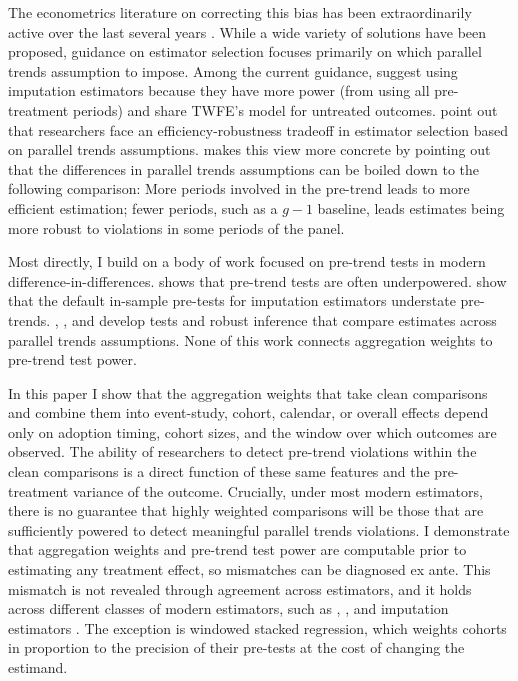 \documentclass[12pt]{article}
\begin{document}
The econometrics literature on correcting this bias has been extraordinarily active over the last several years \parencite{callaway2021difference, sun2021estimating, borusyak2024revisiting, gardner2022two, goodman2021difference,baker2022much, baker2026difference}. While a wide variety of solutions have been proposed, guidance on estimator selection focuses primarily on which parallel trends assumption to impose. Among the current guidance, \textcite{chiu2026causal} suggest using imputation estimators because they have more power (from using all pre-treatment periods) and share TWFE's model for untreated outcomes. \textcite{roth2023s} point out that researchers face an efficiency-robustness tradeoff in estimator selection based on parallel trends assumptions. \textcite{callaway2023difference} makes this view more concrete by pointing out that the differences in parallel trends assumptions can be boiled down to the following comparison: More periods involved in the pre-trend leads to more efficient estimation; fewer periods, such as a $g-1$ baseline, leads estimates being more robust to violations in some periods of the panel.

Most directly, I build on a body of work focused on pre-trend tests in modern difference-in-differences. \textcite{roth2022pretest} shows that pre-trend tests are often underpowered. \textcite{li2025benchmarking} show that the default in-sample pre-tests for imputation estimators understate pre-trends. \textcite{marcus2021role}, \textcite{chen2025efficient}, and \textcite{liu2025cohort} develop tests and robust inference that compare estimates across parallel trends assumptions. None of this work connects aggregation weights to pre-trend test power.

In this paper I show that the aggregation weights that take clean comparisons and combine them into event-study, cohort, calendar, or overall effects depend only on adoption timing, cohort sizes, and the window over which outcomes are observed. The ability of researchers to detect pre-trend violations within the clean comparisons is a direct function of these same features and the pre-treatment variance of the outcome. Crucially, under most modern estimators, there is no guarantee that highly weighted comparisons will be those that are sufficiently powered to detect meaningful parallel trends violations. I demonstrate that aggregation weights and pre-trend test power are computable prior to estimating any treatment effect, so mismatches can be diagnosed ex ante. This mismatch is not revealed through agreement across estimators, and it holds across different classes of modern estimators, such as \textcite{callaway2021difference}, \textcite{sun2021estimating}, and imputation estimators \parencite{borusyak2024revisiting, gardner2022two}. The exception is windowed stacked regression, which weights cohorts in proportion to the precision of their pre-tests at the cost of changing the estimand.
\end{document}
